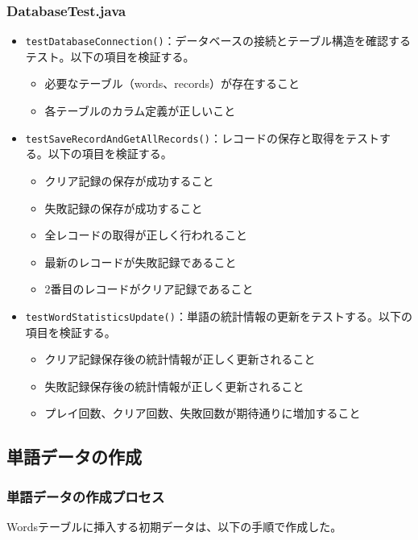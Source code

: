 \documentclass[a4j]{ujarticle}
\begin{document}
\subsubsection{DatabaseTest.java}
\begin{itemize}
  \item \texttt{testDatabaseConnection()}：データベースの接続とテーブル構造を確認するテスト。以下の項目を検証する。
  \begin{itemize}
    \item 必要なテーブル（words、records）が存在すること
    \item 各テーブルのカラム定義が正しいこと
  \end{itemize}
  \item \texttt{testSaveRecordAndGetAllRecords()}：レコードの保存と取得をテストする。以下の項目を検証する。
  \begin{itemize}
    \item クリア記録の保存が成功すること
    \item 失敗記録の保存が成功すること
    \item 全レコードの取得が正しく行われること
    \item 最新のレコードが失敗記録であること
    \item 2番目のレコードがクリア記録であること
  \end{itemize}
  \item \texttt{testWordStatisticsUpdate()}：単語の統計情報の更新をテストする。以下の項目を検証する。
  \begin{itemize}
    \item クリア記録保存後の統計情報が正しく更新されること
    \item 失敗記録保存後の統計情報が正しく更新されること
    \item プレイ回数、クリア回数、失敗回数が期待通りに増加すること
  \end{itemize}
\end{itemize}

\subsection{単語データの作成}
\subsubsection{単語データの作成プロセス}
Wordsテーブルに挿入する初期データは、以下の手順で作成した。
\end{document}
